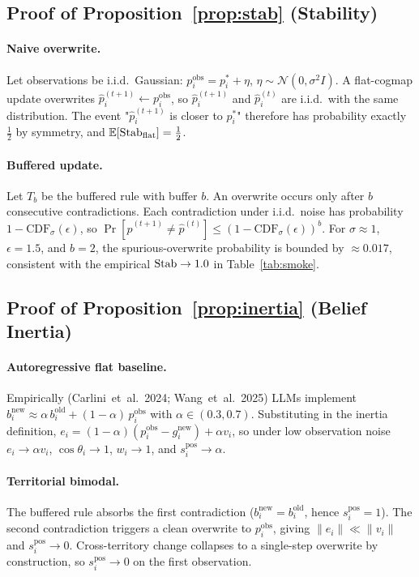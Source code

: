 \subsection{Proof of Proposition~\ref{prop:stab} (Stability)}
\paragraph{Naive overwrite.}
Let observations be i.i.d.\ Gaussian:
$p^{\mathrm{obs}}_i = p^*_i + \eta$,
$\eta\sim\mathcal{N}(0,\sigma^2 I)$. A flat-cogmap update overwrites
$\hat p^{(t+1)}_i \gets p^{\mathrm{obs}}_i$, so $\hat p^{(t+1)}_i$ and
$\hat p^{(t)}_i$ are i.i.d.\ with the same distribution. The event
"$\hat p^{(t+1)}_i$ is closer to $p^*_i$" therefore has probability
exactly $\tfrac12$ by symmetry, and $\mathbb{E}[\mathrm{Stab}_{\mathrm{flat}}]=\tfrac12$.

\paragraph{Buffered update.}
Let $T_b$ be the buffered \tb rule with buffer $b$. An overwrite
occurs only after $b$ consecutive contradictions. Each contradiction
under i.i.d.\ noise has probability $1 - \mathrm{CDF}_\sigma(\epsilon)$,
so $\Pr[\hat p^{(t+1)}\ne\hat p^{(t)}] \le (1-\mathrm{CDF}_\sigma(\epsilon))^b$.
For $\sigma{\approx}1$, $\epsilon{=}1.5$, and $b{=}2$, the spurious-overwrite
probability is bounded by $\approx 0.017$, consistent with the empirical
$\mathrm{Stab}\to 1.0$ in Table~\ref{tab:smoke}.

\subsection{Proof of Proposition~\ref{prop:inertia} (Belief Inertia)}
\paragraph{Autoregressive flat baseline.}
Empirically (Carlini~et~al.~2024; Wang~et~al.~2025) LLMs implement
$b^{\mathrm{new}}_i \approx \alpha\, b^{\mathrm{old}}_i + (1-\alpha)\, p^{\mathrm{obs}}_i$
with $\alpha\in(0.3,0.7)$. Substituting in the \tos inertia
definition,
\(
e_i = (1{-}\alpha)(p^{\mathrm{obs}}_i - g^{\mathrm{new}}_i) + \alpha v_i
\),
so under low observation noise
$e_i\to\alpha v_i$, $\cos\theta_i\to 1$, $w_i\to 1$, and
$s^{\mathrm{pos}}_i\to\alpha$.

\paragraph{Territorial bimodal.}
The buffered rule absorbs the first contradiction
($b^{\mathrm{new}}_i = b^{\mathrm{old}}_i$, hence
$s^{\mathrm{pos}}_i = 1$). The second contradiction triggers a clean
overwrite to $p^{\mathrm{obs}}_i$, giving
$\|e_i\|\ll\|v_i\|$ and $s^{\mathrm{pos}}_i\to 0$. Cross-territory
change collapses to a single-step overwrite by construction, so
$s^{\mathrm{pos}}_i\to 0$ on the first observation.

